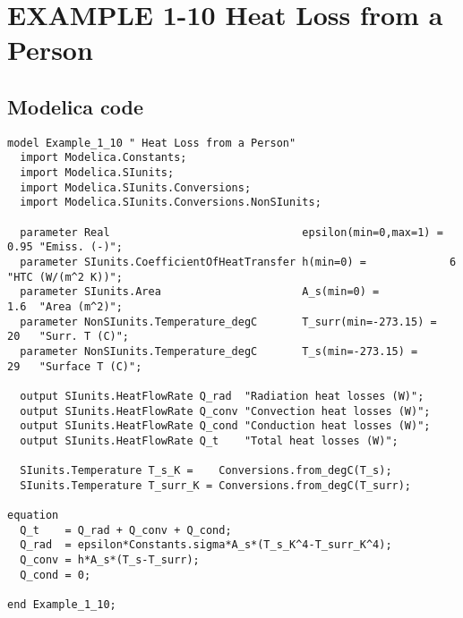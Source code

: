 \documentclass{modelica}
\begin{document}
\thispagestyle{empty}
\date{} %

\section*{EXAMPLE 1-10 Heat Loss from a Person}

\subsection*{Modelica code}


\begin{lstlisting}[mathescape=true] 
model Example_1_10 " Heat Loss from a Person"
  import Modelica.Constants;
  import Modelica.SIunits;
  import Modelica.SIunits.Conversions;
  import Modelica.SIunits.Conversions.NonSIunits;

  parameter Real                              epsilon(min=0,max=1) = 0.95 "Emiss. (-)";
  parameter SIunits.CoefficientOfHeatTransfer h(min=0) =             6    "HTC (W/(m^2 K))";
  parameter SIunits.Area                      A_s(min=0) =           1.6  "Area (m^2)";
  parameter NonSIunits.Temperature_degC       T_surr(min=-273.15) =  20   "Surr. T (C)";
  parameter NonSIunits.Temperature_degC       T_s(min=-273.15) =     29   "Surface T (C)";

  output SIunits.HeatFlowRate Q_rad  "Radiation heat losses (W)";
  output SIunits.HeatFlowRate Q_conv "Convection heat losses (W)";
  output SIunits.HeatFlowRate Q_cond "Conduction heat losses (W)";
  output SIunits.HeatFlowRate Q_t    "Total heat losses (W)";

  SIunits.Temperature T_s_K =    Conversions.from_degC(T_s);
  SIunits.Temperature T_surr_K = Conversions.from_degC(T_surr);

equation 
  Q_t    = Q_rad + Q_conv + Q_cond;
  Q_rad  = epsilon*Constants.sigma*A_s*(T_s_K^4-T_surr_K^4);
  Q_conv = h*A_s*(T_s-T_surr);
  Q_cond = 0;
  
end Example_1_10;  
\end{lstlisting}
\end{document}
